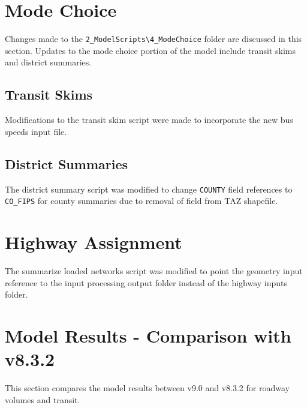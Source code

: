 \documentclass[
  letterpaper,
  DIV=11,
  numbers=noendperiod,
  titlepage=false]{scrreprt}
\begin{document}

\hypertarget{mode-choice-1}{%
\chapter{Mode Choice}\label{mode-choice-1}}

Changes made to the
\texttt{2\_ModelScripts\textbackslash{}4\_ModeChoice} folder are
discussed in this section. Updates to the mode choice portion of the
model include transit skims and district summaries.

\hypertarget{transit-skims}{%
\section{Transit Skims}\label{transit-skims}}

Modifications to the transit skim script were made to incorporate the
new bus speeds input file.

\hypertarget{district-summaries}{%
\section{District Summaries}\label{district-summaries}}

The district summary script was modified to change \texttt{COUNTY} field
references to \texttt{CO\_FIPS} for county summaries due to removal of
field from TAZ shapefile.


\hypertarget{highway-assignment}{%
\chapter{Highway Assignment}\label{highway-assignment}}

The summarize loaded networks script was modified to point the geometry
input reference to the input processing output folder instead of the
highway inputs folder.


\hypertarget{model-results---comparison-with-v8.3.2}{%
\chapter{Model Results - Comparison with
v8.3.2}\label{model-results---comparison-with-v8.3.2}}

This section compares the model results between v9.0 and v8.3.2 for
roadway volumes and transit.
\end{document}
